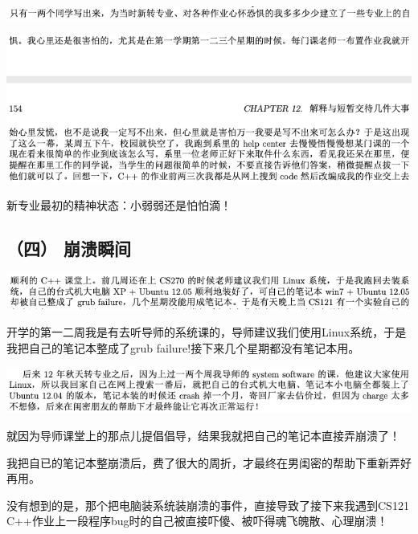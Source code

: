 \documentclass[9pt, b5paper]{article}
\begin{document}
\begin{center}
\includegraphics[width=.9\linewidth]{./pic/backups_plans_20210425_110847.png}
\end{center}

\begin{center}
\includegraphics[width=.9\linewidth]{./pic/backups_plans_20210425_112104.png}
\end{center}

新专业最初的精神状态：小弱弱还是怕怕滴！

\subsection{（四） 崩溃瞬间}
\label{sec:org0e0fdc5}

\begin{center}
\includegraphics[width=.9\linewidth]{./pic/backups_plans_20210424_203440.png}
\end{center}

开学的第一二周我是有去听导师的系统课的，导师建议我们使用Linux系统，于是我把自己的笔记本整成了grub failure!接下来几个星期都没有笔记本用。

\begin{center}
\includegraphics[width=.9\linewidth]{./pic/backups_plans_20210425_125121.png}
\end{center}

就因为导师课堂上的那点儿提倡倡导，结果我就把自己的笔记本直接弄崩溃了！

我把自已的笔记本整崩溃后，费了很大的周折，才最终在男闺密的帮助下重新弄好再用。

没有想到的是，那个把电脑装系统装崩溃的事件，直接导致了接下来我遇到CS121 C++作业上一段程序bug时的自己被直接吓傻、被吓得魂飞魄散、心理崩溃！
\end{document}
